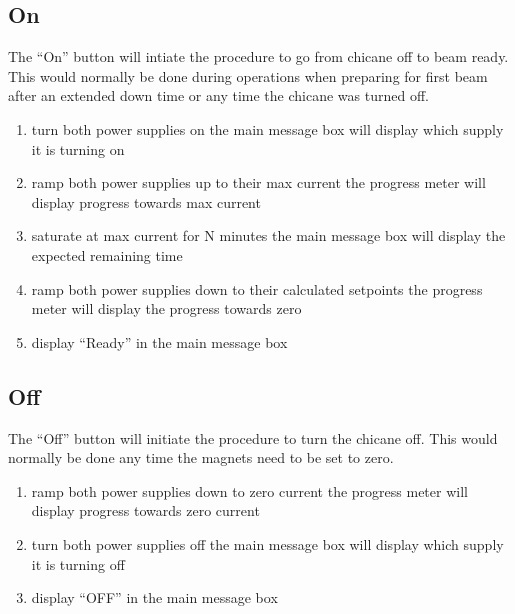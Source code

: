 \documentclass[amsmath,amssymb,notitlepage,12pt]{revtex4-1}
\begin{document}
\subsection{On}
The ``On'' button will intiate the procedure to go from chicane off to beam ready.  This would normally be done during operations when preparing for first beam after an extended down time or any time the chicane was turned off.
\begin{enumerate}
    \item turn both power supplies on
    \subitem the main message box will display which supply it is turning on
    \item ramp both power supplies up to their max current
    \subitem the progress meter will display progress towards max current
    \item saturate at max current for N minutes
    \subitem the main message box will display the expected remaining time
    \item ramp both power supplies down to their calculated setpoints
    \subitem the progress meter will display the progress towards zero
    \item display ``Ready'' in the main message box
\end{enumerate}
\subsection{Off}
The ``Off'' button will initiate the procedure to turn the chicane off.  This would normally be done any time the magnets need to be set to zero.
\begin{enumerate}
    \item ramp both power supplies down to zero current
    \subitem the progress meter will display progress towards zero current
    \item turn both power supplies off
    \subitem the main message box will display which supply it is turning off
    \item display ``OFF'' in the main message box
\end{enumerate}

\newpage
\end{document}
